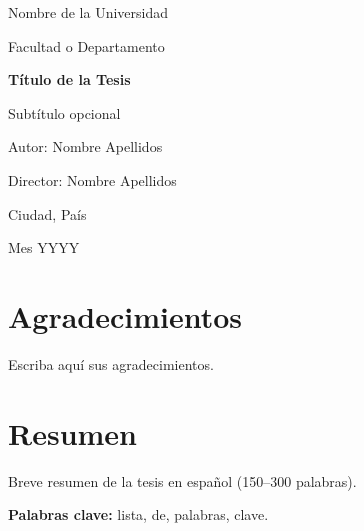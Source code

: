 \documentclass[12pt,oneside,a4paper]{report}
\begin{document}
\begin{titlepage}
  \centering
  {\Large Nombre de la Universidad\par}
  {\large Facultad o Departamento\par}
  \vspace{2cm}
  {\Huge\bfseries Título de la Tesis\par}
  \vspace{0.5cm}
  {\Large Subtítulo opcional\par}
  \vspace{2cm}
  {\large Autor: Nombre Apellidos\par}
  {\large Director: Nombre Apellidos\par}
  \vfill
  {\large Ciudad, País\par}
  {\large Mes YYYY\par}
\end{titlepage}



\chapter*{Agradecimientos}
Escriba aquí sus agradecimientos.

\chapter*{Resumen}
Breve resumen de la tesis en español (150–300 palabras).

\textbf{Palabras clave:} lista, de, palabras, clave.


\tableofcontents
\listoffigures
\listoftables

\cleardoublepage
{}
\onehalfspacing
\end{document}
